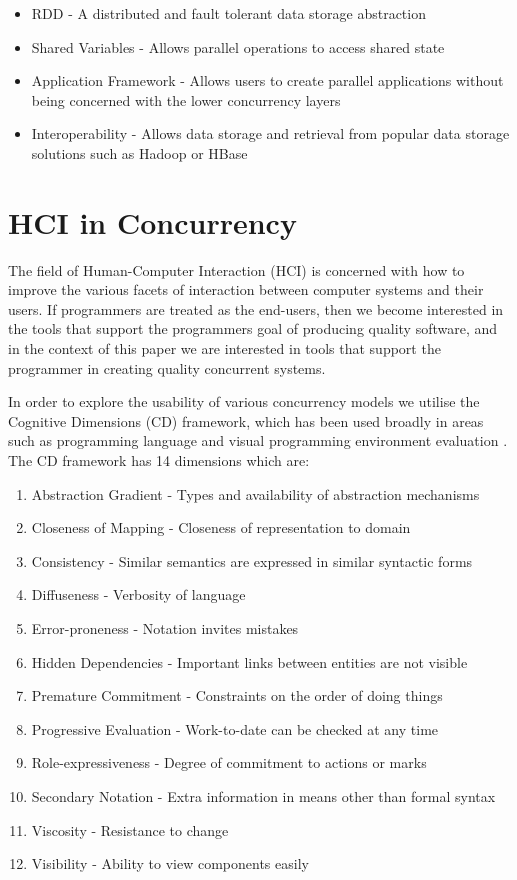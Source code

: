\documentclass{sig-alternate}
\begin{document}
\begin{itemize}
\item RDD - A distributed and fault tolerant data storage abstraction
\item Shared Variables - Allows parallel operations to access shared state
\item Application Framework - Allows users to create parallel applications without being concerned with the lower concurrency layers
\item Interoperability - Allows data storage and retrieval from popular data storage solutions such as Hadoop or HBase
\end{itemize}

\section{HCI in Concurrency}
The field of Human-Computer Interaction (HCI) is concerned with how to improve the various facets of interaction between computer systems and their users. If programmers are treated as the end-users, then we become interested in the tools that support the programmers goal of producing quality \cite{9126} software, and in the context of this paper we are interested in tools that support the programmer in creating quality concurrent systems.

In order to explore the usability of various concurrency models we utilise the Cognitive Dimensions \cite{green89:_cognit_dimen_notat} (CD) framework, 
which has been used broadly in areas such as programming language \cite{enpl} and visual programming environment evaluation \cite{cdf}. The CD framework has 14 dimensions which are:

\begin{enumerate}
\item Abstraction Gradient - Types and availability of abstraction mechanisms
\item Closeness of Mapping - Closeness of representation to domain
\item Consistency - Similar semantics are expressed in similar syntactic forms
\item Diffuseness - Verbosity of language
\item Error-proneness - Notation invites mistakes
\item Hidden Dependencies - Important links between entities are not visible
\item Premature Commitment - Constraints on the order of doing things
\item Progressive Evaluation - Work-to-date can be checked at any time
\item Role-expressiveness - Degree of commitment to actions or marks
\item Secondary Notation - Extra information in means other than formal syntax
\item Viscosity - Resistance to change
\item Visibility - Ability to view components easily
\end{enumerate}
\end{document}
